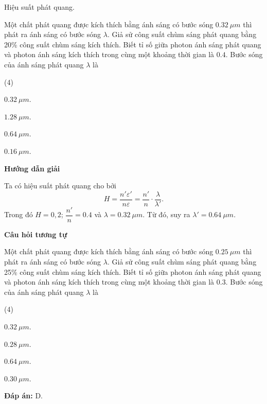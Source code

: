 \begin{dang}{Hiệu suất phát quang.}
	{
		Một chất phát quang được kích thích bằng ánh sáng có bước sóng $ \SI{0,32}{\mu m} $ thì phát ra ánh sáng có bước sóng $\lambda $. Giả sử công suất chùm sáng phát quang bằng 20\% công suất chùm sáng kích thích. Biết tỉ số giữa photon ánh sáng phát quang và photon ánh sáng kích thích trong cùng một khoảng thời gian là $ \num{0,4} $. Bước sóng của ánh sáng phát quang $ \lambda $ là
		\begin{mcq}(4)
			\item $ \SI{0,32}{\mu m} $. 
			\item $ \SI{1,28}{\mu m} $.
			\item $ \SI{0,64}{\mu m} $. 
			\item $ \SI{0,16}{\mu m} $. 
		\end{mcq}
	}
	{
		\begin{center}
			\textbf{Hướng dẫn giải}
		\end{center}
		
		Ta có hiệu suất phát quang cho bởi
		$$
		H = \dfrac{n' \varepsilon'}{n \varepsilon} = \dfrac{n'}{n} \cdot \dfrac{\lambda}{\lambda'}.
		$$	
		Trong đó $ H = 0,2 $; $ \dfrac{n'}{n} = \num{0,4}$ và $ \lambda = \SI{0,32}{\mu m}$.
		Từ đó, suy ra $ \lambda' = \SI{0,64}{\mu m}$.
		
		\begin{center}
			\textbf{Câu hỏi tương tự}
		\end{center}
		
		Một chất phát quang được kích thích bằng ánh sáng có bước sóng $ \SI{0,25}{\mu m} $ thì phát ra ánh sáng có bước sóng $\lambda $. Giả sử công suất chùm sáng phát quang bằng 25\% công suất chùm sáng kích thích. Biết tỉ số giữa photon ánh sáng phát quang và photon ánh sáng kích thích trong cùng một khoảng thời gian là $ \num{0,3} $. Bước sóng của ánh sáng phát quang $ \lambda $ là
		\begin{mcq}(4)
			\item $ \SI{0,32}{\mu m} $. 
			\item $ \SI{0,28}{\mu m} $.
			\item $ \SI{0,64}{\mu m} $. 
			\item $ \SI{0,30}{\mu m} $. 
		\end{mcq}
		\textbf{Đáp án:} D.		
	}
	
\end{dang}
